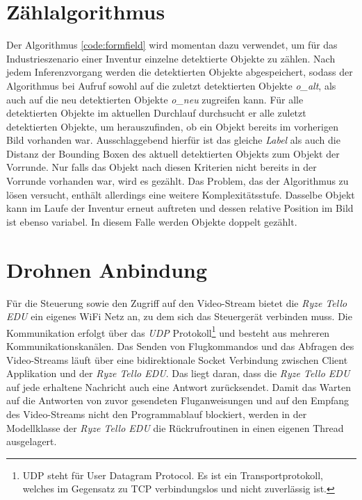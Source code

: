 \newpage

\section{Zählalgorithmus}



Der Algorithmus \ref{code:formfield} wird momentan dazu verwendet, um für das Industrieszenario einer Inventur einzelne detektierte Objekte zu zählen. Nach jedem Inferenzvorgang werden die detektierten Objekte abgespeichert, sodass der Algorithmus bei Aufruf sowohl auf die zuletzt detektierten Objekte \textit{o\_alt}, als auch auf die neu detektierten Objekte \textit{o\_neu} zugreifen kann. Für alle detektierten Objekte im aktuellen Durchlauf durchsucht er alle zuletzt detektierten Objekte, um herauszufinden, ob ein Objekt bereits im vorherigen Bild vorhanden war. Ausschlaggebend hierfür ist das gleiche \textit{Label} als auch die Distanz der Bounding Boxen des aktuell detektierten Objekts zum Objekt der Vorrunde. Nur falls das Objekt nach diesen Kriterien nicht bereits in der Vorrunde vorhanden war, wird es gezählt. Das Problem, das der Algorithmus zu lösen versucht, enthält allerdings eine weitere Komplexitätsstufe. Dasselbe Objekt kann im Laufe der Inventur erneut auftreten und dessen relative Position im Bild ist ebenso variabel. In diesem Falle werden Objekte doppelt gezählt. 

\section{Drohnen Anbindung}

Für die Steuerung sowie den Zugriff auf den Video-Stream bietet die \textit{Ryze Tello EDU} ein eigenes WiFi Netz an, zu dem sich das Steuergerät verbinden muss. Die Kommunikation erfolgt über das \textit{UDP} Protokoll\footnote{UDP steht für User Datagram Protocol. Es ist ein Transportprotokoll, welches im Gegensatz zu TCP verbindungslos und nicht zuverlässig ist.} und besteht aus mehreren Kommunikationskanälen. Das Senden von Flugkommandos und das Abfragen des Video-Streams läuft über eine bidirektionale Socket Verbindung zwischen Client Applikation und der \textit{Ryze Tello EDU}. Das liegt daran, dass die \textit{Ryze Tello EDU} auf jede erhaltene Nachricht auch eine Antwort zurücksendet. Damit das Warten auf die Antworten von zuvor gesendeten Fluganweisungen und auf den Empfang des Video-Streams nicht den Programmablauf blockiert, werden in der Modellklasse der \textit{Ryze Tello EDU} die Rückrufroutinen in einen eigenen Thread ausgelagert.

